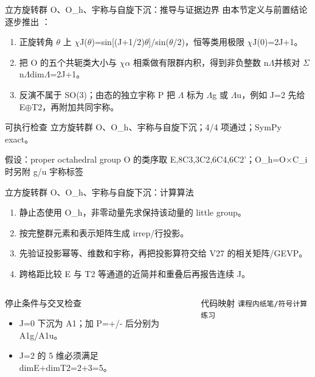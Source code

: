 \begin{frame}[t]{立方旋转群 O、O\_h、宇称与自旋下沉：推导与证据边界}
\footnotesize
{}\quad 由本节定义与前置结论逐步推出 ：
\begin{enumerate}
\item 正旋转角 \ensuremath{\theta} 上 \ensuremath{\chi}J(\ensuremath{\theta})=sin[(J+1/\allowbreak{}2)\ensuremath{\theta}]/\allowbreak{}sin(\ensuremath{\theta}/\allowbreak{}2)，恒等类用极限 \ensuremath{\chi}J(0)=2J+1。
\item 把 O 的五个共轭类大小与 \ensuremath{\chi}\ensuremath{\alpha} 相乘做有限群内积，得到非负整数 n\ensuremath{\Lambda}并核对 \ensuremath{\Sigma}n\ensuremath{\Lambda}dim\ensuremath{\Lambda}=2J+1。
\item 反演不属于 SO(3)；由态的独立宇称 P 把 \ensuremath{\Lambda} 标为 \ensuremath{\Lambda}g 或 \ensuremath{\Lambda}u，例如 J=2 先给 E\ensuremath{\oplus}T2，再附加共同宇称。
\end{enumerate}\begin{block}{可执行检查}
\quad 立方旋转群 O、O\_h、宇称与自旋下沉；4/4 项通过；SymPy exact。
\par\scriptsize 假设：proper octahedral group O 的类序取 E,8C3,3C2,6C4,6C2'；O\_h=O\ensuremath{\times}C\_i 时另附 g/\allowbreak{}u 宇称标签
\end{block}
\end{frame}

\begin{frame}[t]{立方旋转群 O、O\_h、宇称与自旋下沉：计算算法}
\footnotesize
{}\begin{enumerate}
\item 静止态使用 O\_h，非零动量先求保持该动量的 little group。
\item 按完整群元素和表示矩阵生成 irrep/\allowbreak{}行投影。
\item 先验证投影幂等、维数和宇称，再把投影算符交给 V27 的相关矩阵/\allowbreak{}GEVP。
\item 跨格距比较 E 与 T2 等通道的近简并和重叠后再报告连续 J。
\end{enumerate}\begin{columns}[T,onlytextwidth]
\begin{block}{停止条件与交叉检查}\scriptsize\begin{itemize}
\item[\CheckMark] J=0 下沉为 A1；加 P=+/\allowbreak{}- 后分别为 A1g/\allowbreak{}A1u。
\item[\CheckMark] J=2 的 5 维必须满足 dimE+dimT2=2+3=5。
\end{itemize}\end{block}
\begin{block}{代码映射}
\scriptsize \texttt{课程内纸笔/\allowbreak{}符号计算练习}
\end{block}\end{columns}\end{frame}

